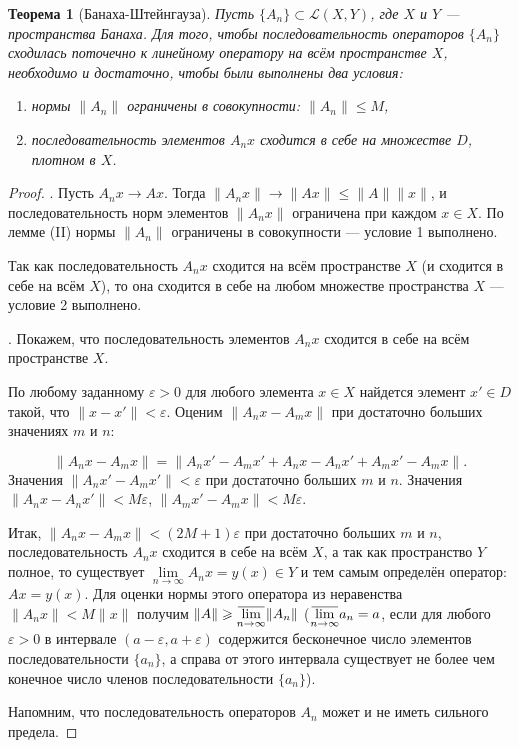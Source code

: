 \documentclass[12pt,a4paper,titlepage,oneside]{book}
\newcommand{\overbar}[1]{\mkern 1.5mu\overline{\mkern-1.5mu#1\mkern-1.5mu}\mkern 1.5mu}
\theoremstyle{definition}
\theoremstyle{plain}
\newtheorem*{theorem}{Теорема}
\theoremstyle{break}
\theoremstyle{remark}
\theoremstyle{remark}
\theoremstyle{remark}
\theoremstyle{remark}
\theoremstyle{plain}
\theoremstyle{plain}
\begin{document}
\begin{theorem}[Банаха-Штейнгауза]
Пусть $\lbrace A_n\rbrace \subset \mathcal{L}(X,Y)$, где $X$ и $Y$ --- пространства Банаха. Для того, чтобы последовательность операторов $\lbrace A_n\rbrace$ сходилась поточечно к линейному оператору на всём пространстве $X$, необходимо и достаточно, чтобы были выполнены два условия:

\begin{enumerate}
\item нормы $\lVert A_n\rVert$ ограничены в совокупности: $\lVert A_n\rVert \leqslant M$,
\item последовательность элементов $A_n x$ сходится в себе на множестве $D$, плотном в $X$.
\end{enumerate}
\end{theorem}

\begin{proof}
. Пусть $A_n x \to A x$. Тогда $\lVert A_n x\rVert \to \lVert A x\rVert \leqslant \lVert A\rVert \lVert x\rVert$, и последовательность норм элементов $\lVert A_n x\rVert$ ограничена при каждом $x \in X$. По лемме (II) нормы $\lVert A_n\rVert$ ограничены в совокупности --- условие 1 выполнено.

Так как последовательность $A_n x$ сходится на всём пространстве $X$ (и сходится в себе на всём $X$), то она сходится в себе на любом множестве пространства $X$ --- условие 2 выполнено.

. Покажем, что последовательность элементов $A_n x$ сходится в себе на всём пространстве $X$.

По любому заданному $\varepsilon > 0$ для любого элемента $x \in X$ найдется элемент $x' \in D$ такой, что $\lVert x - x'\rVert < \varepsilon$. Оценим $\lVert A_n x - A_m x\rVert$ при достаточно больших значениях $m$ и $n$:

$$\lVert A_n x - A_m x\rVert = \lVert A_n x' - A_m x' + A_n x - A_n x' + A_m x' - A_m x\rVert.$$
Значения $\lVert A_n x' - A_m x'\rVert < \varepsilon$ при достаточно больших $m$ и $n$.
Значения $\lVert A_n x - A_n x'\rVert < M\varepsilon$, $\lVert A_m x' - A_m x\rVert < M\varepsilon$.

Итак, $\lVert A_n x - A_m x\rVert < (2M +1)\varepsilon$ при достаточно больших $m$ и $n$, последовательность $A_n x$ сходится в себе на всём $X$, а так как пространство $Y$ полное, то существует $\lim\limits_{n \to \infty} A_n x = y(x) \in Y$ и тем самым определён оператор: $A x = y(x)$. Для оценки нормы этого оператора из неравенства $\lVert A_n x\rVert < M\lVert x\rVert$ получим $\lVert A\rVert \geqslant \overbar{\lim\limits_{n \to \infty}}\lVert A_n\rVert$ ($\overbar{\lim\limits_{n \to \infty}}a_n = a$, если для любого $\varepsilon > 0$ в интервале $(a-\varepsilon, a+\varepsilon)$ содержится бесконечное число элементов последовательности $\lbrace a_n\rbrace$, а справа от этого интервала существует не более чем конечное число членов последовательности $\lbrace a_n\rbrace$).

Напомним, что последовательность операторов $A_n$ может и не иметь сильного предела.
\end{proof}
\end{document}
